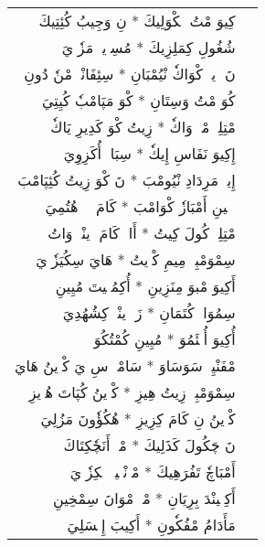 \documentclass[a4paper, 12pt]{report}
\begin{document}
\begin{longtable}{rl}
\textarabic{كِيوَ مْتُ مٖكْوَلِيكَ  *  نِ وَجِيبُ كُئِتِيكَ} & \\ 
\textarabic{شُغُولِ كِمَلِزِيكَ  *  مُسِوٖيكٖ مَزٗوٖيَ} & \\ 
[8mm] 

\textarabic{نَ وٖيوٖ كْوَاكٗ نْيُمْبَانِ  *  سِئِفَانْيٖ مْنٗ دُونِ} & \\ 
\textarabic{كُوَ مْتُ وَسِتَانِ  *  كْوَ مَپَامْبٗ كُيِتِيَ} & \\ 
[8mm] 

\textarabic{مْتِلِيٖ مْكٖ وَاكٗ  *  زِيتُ كْوَ كَدِيرِ يَاكٗ} & \\ 
\textarabic{إِكِيوَ نَفَاسِ إِيكٗ  *  سِبَانٖ أُكَزِوِيَ} & \\ 
[8mm] 

\textarabic{إِيوٖ مَرِدَادِ نْيُومْبَ  *  نَ كْوَ زِيتُ كُئِپَامْبَ} & \\ 
\textarabic{فٖشٖينِ أَمْبَازٗ كْوَامْبَ  *  كَامَ يٖيٖ هُتُمِيَ} & \\ 
[8mm] 

\textarabic{مْتِلِيٖ كُولَ كِيتُ  *  أَاوٖ كَامَ وٖينْدٖ وَاتُ} & \\ 
\textarabic{سِمْوَمْبِيٖ مِيمِ كْوٖيتُ  *  هَايَ سِكُيَزٗوٖيَ} & \\ 
[8mm] 

\textarabic{أَكِيوَ مْبوَ مِنَزِينِ  *  أُكِمُئٖيتَ مُيِينِ} & \\ 
\textarabic{سِمُوَاتٖ كُتَمَانِ  *  زَ وٖينْدٖ كِشُهُدِيَ} & \\ 
[8mm] 

\textarabic{أُكِيوَ أُمٖئَمُوَ  *  مُيِينِ كُمْتُكُوَ} & \\ 
\textarabic{مْفَنْيِئٖ سَوَسَاوَ  *  سَامْبٖ سِ يَ كْوٖينُ هَايَ} & \\ 
[8mm] 

\textarabic{سِمْوَمْبِيٖ زِيتُ هِيزِ  *  كْوٖينُ كُپَاتَ هُوٖيزِ} & \\ 
\textarabic{كْوٖينُ نِ كَامَ كِزِيزِ  *  هُكُؤٗونَ مَزُلِيَ} & \\ 
[8mm] 

\textarabic{نَ چَكُولَ كَذَلِيكَ  *  مْپٖ أَنَچٗكِتَاكَ} & \\ 
\textarabic{أَمْبَاچٗ تَفُرَهِيكَ  *  مْوٖنْيٖيوٖ مٖكِزٗوٖيَ} & \\ 
[8mm] 

\textarabic{أَكِپٖينْدَ بِرِيَانِ  *  مْپٖ مْوَانَ سِمْخِينِ} & \\ 
\textarabic{مَأَدَامُ مْفُكٗونِ  *  أَكِيبَ إِمٖسَلِيَ} & \\ 
[8mm] 


\end{longtable}
\end{document}
